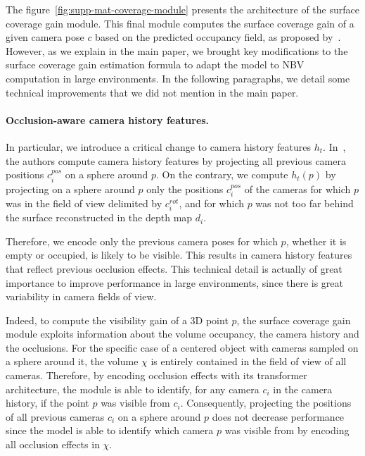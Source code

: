 

The figure~\ref{fig:supp-mat-coverage-module} presents the architecture of the surface coverage gain module. This final module computes the surface coverage gain of a given camera pose $c$ based on the predicted occupancy field, as proposed by~\cite{guedon-nips22-scone-surface-coverage}. %
However, as we explain in the main paper, we brought key modifications to the surface coverage gain estimation formula to adapt the model to NBV computation in large environments. In the following paragraphs, we detail some technical improvements that we did not mention in the main paper.

\paragraph{Occlusion-aware camera history features.} In particular, we introduce a critical change to camera history features $h_t$. In~\cite{guedon-nips22-scone-surface-coverage}, the authors compute camera history features by projecting all previous camera positions $c_i^{pos}$ on a sphere around $p$. On the contrary, we compute $h_t(p)$ by projecting on a sphere around $p$ only the positions $c_i^{pos}$ of the cameras for which $p$ was in the field of view delimited by $c_i^{rot}$, and for which $p$ was not too far behind the surface reconstructed in the depth map $d_i$. 

Therefore, we encode only the previous camera poses for which $p$, whether it is empty or occupied, is likely to be visible. This results in camera history features that reflect previous occlusion effects. This technical detail is actually of great importance to improve performance in large environments, since there is great variability in camera fields of view.

Indeed, to compute the visibility gain of a 3D point $p$, the surface coverage gain module exploits information about the volume occupancy, the camera history and the occlusions. For the specific case of a centered object with cameras sampled on a sphere around it, the volume $\chi$ is entirely contained in the field of view of all cameras. Therefore, by encoding occlusion effects with its transformer architecture, the module is able to identify, for any camera $c_i$ in the camera history, if the point $p$ was visible from $c_i$. Consequently, projecting the positions of all previous cameras $c_i$ on a sphere around $p$ does not decrease performance since the model is able to identify which camera $p$ was visible from by encoding all occlusion effects in $\chi$.

